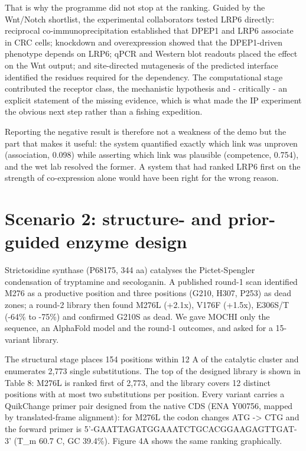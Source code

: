 That is why the programme did not stop at the ranking. Guided by the Wnt/Notch shortlist, the experimental collaborators tested LRP6 directly: reciprocal co-im\-mu\-no\-pre\-cip\-i\-ta\-tion established that DPEP1 and LRP6 associate in CRC cells; knockdown and overexpression showed that the DPEP1-driven phenotype depends on LRP6; qPCR and Western blot readouts placed the effect on the Wnt output; and site-directed mutagenesis of the predicted interface identified the residues required for the dependency. The computational stage contributed the receptor class, the mechanistic hypothesis and - critically - an explicit statement of the missing evidence, which is what made the IP experiment the obvious next step rather than a fishing expedition.

Reporting the negative result is therefore not a weakness of the demo but the part that makes it useful: the system quantified exactly which link was unproven (association, 0.098) while asserting which link was plausible (competence, 0.754), and the wet lab resolved the former. A system that had ranked LRP6 first on the strength of co-expression alone would have been right for the wrong reason.

\section{Scenario 2: structure- and prior-guided enzyme design}

Strictosidine synthase (P68175, 344 aa) catalyses the Pictet-Spengler condensation of tryp\-ta\-mine and se\-co\-lo\-ga\-nin. A published round-1 scan identified M276 as a productive position and three positions (G210, H307, P253) as dead zones; a round-2 library then found M276L (+2.1x), V176F (+1.5x), E306S/T (-64\% to -75\%) and confirmed G210S as dead. We gave MOCHI only the sequence, an AlphaFold model and the round-1 outcomes, and asked for a 15-variant library.

The structural stage places 154 positions within 12 A of the catalytic cluster and enumerates 2,773 single substitutions. The top of the designed library is shown in Table 8: M276L is ranked first of 2,773, and the library covers 12 distinct positions with at most two substitutions per position. Every variant carries a QuikChange primer pair designed from the native CDS (ENA Y00756, mapped by translated-frame alignment): for M276L the codon changes ATG -> CTG and the forward primer is 5'-GAATTAGATGGAAATCTGCACGGAAGAGTTGAT-3' (T\_m 60.7 C, GC 39.4\%). Figure 4A shows the same ranking graphically.

